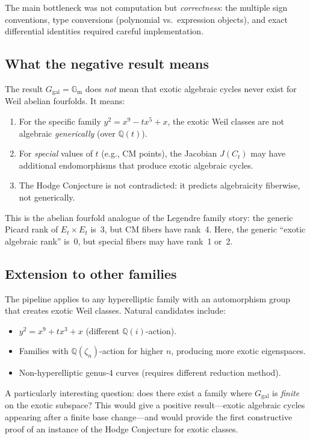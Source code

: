 \documentclass[11pt]{article}
\theoremstyle{plain}
\theoremstyle{definition}
\theoremstyle{remark}
\newcommand{\Q}{\mathbb{Q}}
\newcommand{\Ggal}{G_{\mathrm{gal}}}
\newcommand{\Gm}{\mathbb{G}_{\mathrm{m}}}
\begin{document}
The main bottleneck was not computation but \emph{correctness}: the
multiple sign conventions, type conversions (polynomial vs.\ expression
objects), and exact differential identities required careful implementation.

\subsection{What the negative result means}

The result $\Ggal = \Gm$ does \emph{not} mean that exotic algebraic
cycles never exist for Weil abelian fourfolds. It means:

\begin{enumerate}[nosep]
\item For the specific family $y^2 = x^9 - tx^5 + x$, the exotic Weil
  classes are not algebraic \emph{generically} (over $\Q(t)$).
\item For \emph{special} values of $t$ (e.g., CM points), the Jacobian
  $J(C_t)$ may have additional endomorphisms that produce exotic algebraic cycles.
\item The Hodge Conjecture is not contradicted: it predicts algebraicity
  fiberwise, not generically.
\end{enumerate}

This is the abelian fourfold analogue of the Legendre family story:
the generic Picard rank of $E_t \times E_t$ is~3, but CM fibers have
rank~4. Here, the generic ``exotic algebraic rank'' is~0, but special
fibers may have rank~1 or~2.

\subsection{Extension to other families}

The pipeline applies to any hyperelliptic family with an automorphism
group that creates exotic Weil classes. Natural candidates include:
\begin{itemize}[nosep]
\item $y^2 = x^9 + tx^3 + x$ (different $\Q(i)$-action).
\item Families with $\Q(\zeta_n)$-action for higher $n$, producing more
  exotic eigenspaces.
\item Non-hyperelliptic genus-4 curves (requires different reduction method).
\end{itemize}

A particularly interesting question: does there exist a family where
$\Ggal$ is \emph{finite} on the exotic subspace? This would give a
positive result---exotic algebraic cycles appearing after a finite base
change---and would provide the first constructive proof of an instance
of the Hodge Conjecture for exotic classes.
\end{document}

